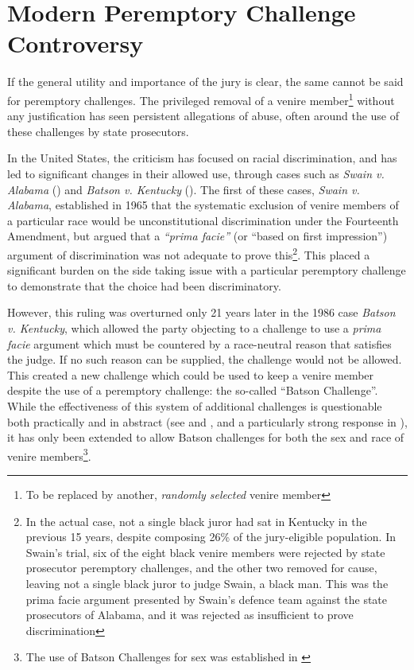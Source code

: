 \section{Modern Peremptory Challenge Controversy} \label{sec:modper}

If the general utility and importance of the jury is clear, the same cannot be said for peremptory challenges. The privileged
removal of a venire member\footnote{To be replaced by another, \textit{randomly selected} venire member} without any justification
has seen persistent allegations of abuse, often around the use of these challenges by state prosecutors.

In the United States, the criticism has focused on racial discrimination, and has led to significant changes in their allowed use,
through cases such as \textit{Swain v. Alabama} (\cite{swainvalabama}) and \textit{Batson v. Kentucky}
(\cite{batsonvkentucky}). The first of these cases, \textit{Swain v. Alabama}, established in 1965 that the systematic exclusion
of venire members of a particular race would be unconstitutional discrimination under the Fourteenth Amendment, but argued that a
\textit{``prima facie''} (or ``based on first impression'') argument of discrimination was not adequate to prove this\footnote{In
  the actual case, not a single black juror had sat in Kentucky in the previous 15 years, despite composing 26\% of the
  jury-eligible population. In Swain's trial, six of the eight black venire members were rejected by state prosecutor peremptory
  challenges, and the other two removed for cause, leaving not a single black juror to judge Swain, a black man. This was the
  prima facie argument presented by Swain's defence team against the state prosecutors of Alabama, and it was rejected as
  insufficient to prove discrimination}. This placed a significant burden on the side taking issue with a particular peremptory
challenge to demonstrate that the choice had been discriminatory.

However, this ruling was overturned only 21 years later in the 1986 case \textit{Batson v. Kentucky}, which allowed the
party objecting to a challenge to use a \textit{prima facie} argument which must be countered by a race-neutral reason that
satisfies the judge. If no such reason can be supplied, the challenge would not be allowed. This created a new challenge which
could be used to keep a venire member despite the use of a peremptory challenge: the so-called ``Batson Challenge''. While the
effectiveness of this system of additional challenges is questionable both practically and in abstract (see \cite{page2005} and
\cite{morehead1994}, and a particularly strong response in \cite{hoffman1997}), it has only been extended to allow Batson
challenges for both the sex and race of venire members\footnote{The use of Batson Challenges for sex was established in
  \cite{jebvalabama}}.


